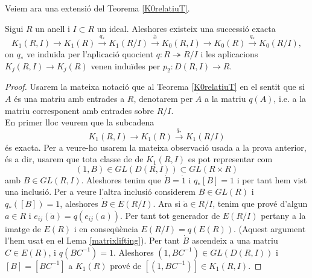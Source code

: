 Veiem ara una extensió del Teorema \ref{K0relatiuT}.
\begin{theorem}
Sigui $R$ un anell i $I\subset R$ un ideal. Aleshores existeix una successió exacta 
\begin{equation}\label{super}
K_1(R,I) \rightarrow K_1(R) \xrightarrow{q_*} K_1(R/I) \xrightarrow{\partial} K_0(R,I) \rightarrow K_0(R) \xrightarrow{q_*} K_0(R/I),
\end{equation}
on $q_*$ ve induïda per l'aplicació quocient $q: R\twoheadrightarrow R/I$ i les aplicacions $K_j(R,I) \rightarrow K_j(R)$ venen induïdes per $p_2: D(R,I) \rightarrow R$.
\end{theorem}

\begin{proof}
Usarem la mateixa notació que al Teorema \ref{K0relatiuT} en el sentit que si $A$ és una matriu amb entrades a $R$, denotarem per $\dot{A}$ a la matriu $q(A)$, i.e. a la matriu corresponent amb entrades sobre $R/I$. \\
\indent En primer lloc veurem que la subcadena 
$$
K_1(R,I)\rightarrow K_1(R) \xrightarrow{q_*}K_1(R/I)
$$
és exacta. Per a veure-ho usarem la mateixa observació usada a la prova anterior, és a dir, usarem que tota classe de de $K_1(R,I)$ es pot representar com
$$
(1,B)\in GL(D(R,I)) \subset GL(R\times R)
$$ 
amb $B\in GL(R,I)$. Aleshores tenim que $\dot{B}=\dot{1}$ i $q_*[B]=1$ i per tant hem vist una inclusió. Per a veure l'altra inclusió considerem $B\in GL(R)$ i $q_*([B])=1$, aleshores $\dot{B}\in E(R/I)$. Ara si $\dot{a}\in R/I$, tenim que prové d'algun $a\in R$ i $e_{ij}(\dot{a})=q(e_{ij}(a))$. Per tant tot generador de $E(R/I)$ pertany a la imatge de $E(R)$ i en conseqüència $E(R/I)=q(E(R))$. (Aquest argument l'hem usat en el Lema  \ref{matrixlifting}). Per tant $\dot{B}$ ascendeix a una matriu $C\in E(R)$, i $q(BC^{-1})=1$. Aleshores $(1,BC^{-1})\in GL(D(R,I))$ i $[B]=[BC^{-1}]$ a $K_1(R)$ prové de $[(1,BC^{-1})]\in K_1(R,I)$.


\end{proof}
